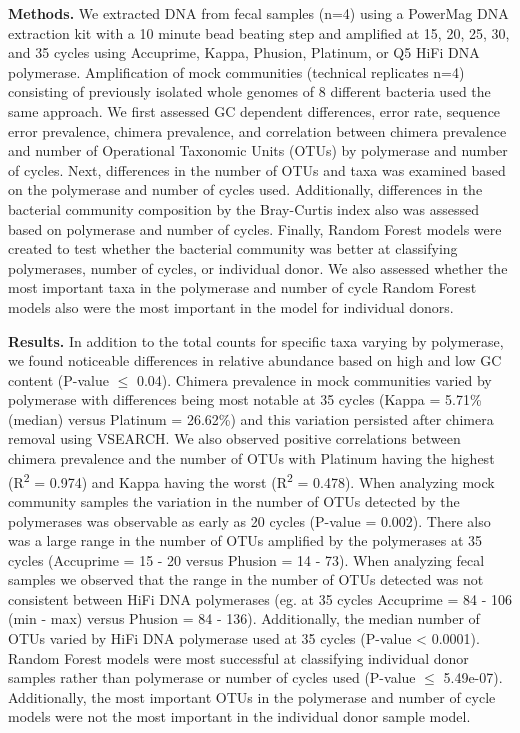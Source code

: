 \documentclass[11pt,]{article}
\begin{document}
\textbf{Methods.} We extracted DNA from fecal samples (n=4) using a
PowerMag DNA extraction kit with a 10 minute bead beating step and
amplified at 15, 20, 25, 30, and 35 cycles using Accuprime, Kappa,
Phusion, Platinum, or Q5 HiFi DNA polymerase. Amplification of mock
communities (technical replicates n=4) consisting of previously isolated
whole genomes of 8 different bacteria used the same approach. We first
assessed GC dependent differences, error rate, sequence error
prevalence, chimera prevalence, and correlation between chimera
prevalence and number of Operational Taxonomic Units (OTUs) by
polymerase and number of cycles. Next, differences in the number of OTUs
and taxa was examined based on the polymerase and number of cycles used.
Additionally, differences in the bacterial community composition by the
Bray-Curtis index also was assessed based on polymerase and number of
cycles. Finally, Random Forest models were created to test whether the
bacterial community was better at classifying polymerases, number of
cycles, or individual donor. We also assessed whether the most important
taxa in the polymerase and number of cycle Random Forest models also
were the most important in the model for individual donors.

\textbf{Results.} In addition to the total counts for specific taxa
varying by polymerase, we found noticeable differences in relative
abundance based on high and low GC content (P-value \(\leqslant\) 0.04).
Chimera prevalence in mock communities varied by polymerase with
differences being most notable at 35 cycles (Kappa = 5.71\% (median)
versus Platinum = 26.62\%) and this variation persisted after chimera
removal using VSEARCH. We also observed positive correlations between
chimera prevalence and the number of OTUs with Platinum having the
highest (R\textsuperscript{2} = 0.974) and Kappa having the worst
(R\textsuperscript{2} = 0.478). When analyzing mock community samples
the variation in the number of OTUs detected by the polymerases was
observable as early as 20 cycles (P-value = 0.002). There also was a
large range in the number of OTUs amplified by the polymerases at 35
cycles (Accuprime = 15 - 20 versus Phusion = 14 - 73). When analyzing
fecal samples we observed that the range in the number of OTUs detected
was not consistent between HiFi DNA polymerases (eg. at 35 cycles
Accuprime = 84 - 106 (min - max) versus Phusion = 84 - 136).
Additionally, the median number of OTUs varied by HiFi DNA polymerase
used at 35 cycles (P-value \textless{} 0.0001). Random Forest models
were most successful at classifying individual donor samples rather than
polymerase or number of cycles used (P-value \(\leqslant\) 5.49e-07).
Additionally, the most important OTUs in the polymerase and number of
cycle models were not the most important in the individual donor sample
model.
\end{document}
